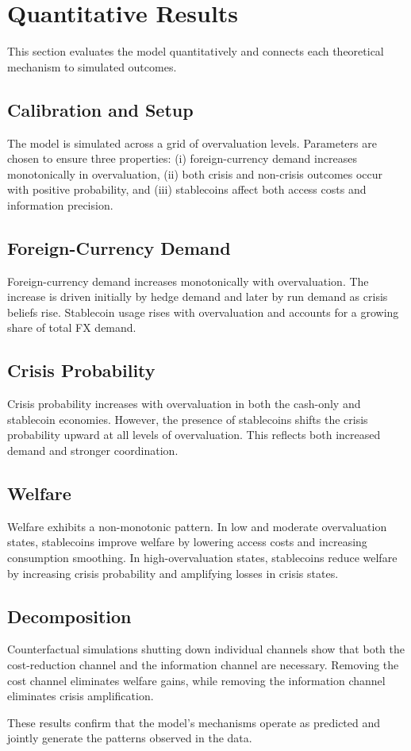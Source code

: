 \section{Quantitative Results}

This section evaluates the model quantitatively and connects each theoretical mechanism to simulated outcomes.

\subsection{Calibration and Setup}

The model is simulated across a grid of overvaluation levels. Parameters are chosen to ensure three properties: (i) foreign-currency demand increases monotonically in overvaluation, (ii) both crisis and non-crisis outcomes occur with positive probability, and (iii) stablecoins affect both access costs and information precision.

\subsection{Foreign-Currency Demand}

Foreign-currency demand increases monotonically with overvaluation. The increase is driven initially by hedge demand and later by run demand as crisis beliefs rise. Stablecoin usage rises with overvaluation and accounts for a growing share of total FX demand.

\subsection{Crisis Probability}

Crisis probability increases with overvaluation in both the cash-only and stablecoin economies. However, the presence of stablecoins shifts the crisis probability upward at all levels of overvaluation. This reflects both increased demand and stronger coordination.

\subsection{Welfare}

Welfare exhibits a non-monotonic pattern. In low and moderate overvaluation states, stablecoins improve welfare by lowering access costs and increasing consumption smoothing. In high-overvaluation states, stablecoins reduce welfare by increasing crisis probability and amplifying losses in crisis states.

\subsection{Decomposition}

Counterfactual simulations shutting down individual channels show that both the cost-reduction channel and the information channel are necessary. Removing the cost channel eliminates welfare gains, while removing the information channel eliminates crisis amplification.

These results confirm that the model’s mechanisms operate as predicted and jointly generate the patterns observed in the data.
